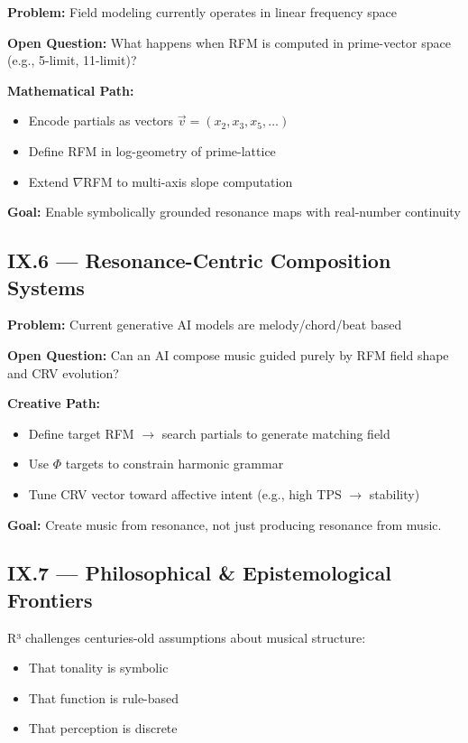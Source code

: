 \documentclass{article}
\begin{document}
\textbf{Problem:}  
Field modeling currently operates in linear frequency space

\textbf{Open Question:}  
What happens when RFM is computed in prime-vector space (e.g., 5-limit, 11-limit)?

\textbf{Mathematical Path:}
\begin{itemize}
    \item Encode partials as vectors $\vec{v} = (x_2, x_3, x_5, \ldots)$
    \item Define RFM in log-geometry of prime-lattice
    \item Extend $\nabla$RFM to multi-axis slope computation
\end{itemize}

\textbf{Goal:}  
Enable symbolically grounded resonance maps with real-number continuity

\subsection*{IX.6 — Resonance-Centric Composition Systems}

\textbf{Problem:}  
Current generative AI models are melody/chord/beat based

\textbf{Open Question:}  
Can an AI compose music guided purely by RFM field shape and CRV evolution?

\textbf{Creative Path:}
\begin{itemize}
    \item Define target RFM $\rightarrow$ search partials to generate matching field
    \item Use $\Phi$ targets to constrain harmonic grammar
    \item Tune CRV vector toward affective intent (e.g., high TPS $\rightarrow$ stability)
\end{itemize}

\textbf{Goal:}  
Create music from resonance, not just producing resonance from music.

\subsection*{IX.7 — Philosophical \& Epistemological Frontiers}

R³ challenges centuries-old assumptions about musical structure:

\begin{itemize}
    \item That tonality is symbolic
    \item That function is rule-based
    \item That perception is discrete
\end{itemize}
\end{document}
